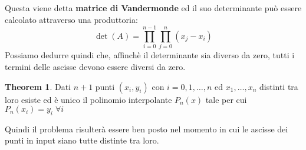 \documentclass[12pt, a4paper]{book}
\theoremstyle{definition}
\newtheorem{theorem}{Theorem}
\begin{document}
\begin{flushleft}
Questa viene detta \textbf{matrice di Vandermonde} ed il suo determinante può essere calcolato attraverso una produttoria: 
\[ 
	\det(A) = \prod_{i = 0}^{n-1}\prod_{j = 0}^{n} (x_{j} - x_{i})
\]
Possiamo dedurre quindi che,  affinchè il determinante sia diverso da zero, tutti i termini delle ascisse devono essere diversi da zero. 

\begin{theorem}
	Dati $n+1$ punti $(x_{i}, y_{i})$ con $i = 0,1, \dots, n$ ed $x_{1}, \dots, x_{n}$ distinti tra loro esiste ed è unico il polinomio interpolante $P_{n}(x)$ tale per cui $P_{n}(x_{i}) = y_{i} \; \forall i$
\end{theorem}
Quindi il problema risulterà essere ben posto nel momento in cui le ascisse dei punti in input siano tutte distinte tra loro.
\end{flushleft}
\end{document}
